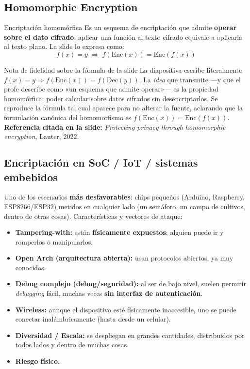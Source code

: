 \documentclass[11pt,a4paper]{article}
\begin{document}
\subsection{Homomorphic Encryption}

\begin{defbox}{Encriptación homomórfica}
Es un esquema de encriptación que admite \textbf{operar sobre el dato cifrado}: aplicar una
función al texto cifrado equivale a aplicarla al texto plano. La slide lo expresa como:
\[
  f(x) = y \;\Longrightarrow\; f(\mathrm{Enc}(x)) = \mathrm{Enc}(f(x))
\]
\end{defbox}

\begin{warnbox}{Nota de fidelidad sobre la fórmula de la slide}
La diapositiva escribe literalmente \(f(x)=y \Rightarrow f(\mathrm{Enc}(x)) =
f(\mathrm{Dec}(y))\). La \emph{idea} que transmite —y que el profe describe como «un esquema
que admite operar»— es la propiedad homomórfica: poder calcular sobre datos cifrados sin
desencriptarlos. Se reproduce la fórmula tal cual aparece para no alterar la fuente, aclarando
que la formulación canónica del homomorfismo es \(f(\mathrm{Enc}(x)) = \mathrm{Enc}(f(x))\).
\textbf{Referencia citada en la slide:} \emph{Protecting privacy through homomorphic
encryption}, Lauter, 2022.
\end{warnbox}

\subsection{Encriptación en SoC / IoT / sistemas embebidos}

Uno de los escenarios \textbf{más desfavorables}: chips pequeños (Arduino, Raspberry,
ESP8266/ESP32) metidos en cualquier lado (un semáforo, un campo de cultivos, dentro de otras
cosas). Características y vectores de ataque:

\begin{itemize}[leftmargin=1.4em,itemsep=2pt]
  \item \textbf{Tampering-with:} están \textbf{físicamente expuestos}; alguien puede ir y
        romperlos o manipularlos.
  \item \textbf{Open Arch (arquitectura abierta):} usan protocolos abiertos, ya muy conocidos.
  \item \textbf{Debug complejo (debug/seguridad):} al ser de bajo nivel, suelen permitir
        \emph{debugging} fácil, muchas veces \textbf{sin interfaz de autenticación}.
  \item \textbf{Wireless:} aunque el dispositivo esté físicamente inaccesible, uno se puede
        conectar inalámbricamente (hasta desde un celular).
  \item \textbf{Diversidad / Escala:} se despliegan en grandes cantidades, distribuidos por
        todos lados y dentro de muchas cosas.
  \item \textbf{Riesgo físico.}
\end{itemize}
\end{document}
